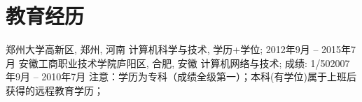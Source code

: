 \section{\textbf{教育经历}}
  \resumeSubHeadingListStart
    \resumeSubheading
      {郑州大学}{高新区, 郑州, 河南}
      {计算机科学与技术, 学历+学位; }{2012年9月 -- 2015年7月}
    \resumeSubheading
      {安徽工商职业技术学院}{庐阳区, 合肥, 安徽}
      {计算机网络与技术; 成绩: 1/50}{2007年9月 -- 2010年7月}
  \resumeSubHeadingListEnd
  \noindent\scriptsize 注意：学历为专科（成绩全级第一）；本科(有学位)属于上班后获得的远程教育学历；
  \normalsize